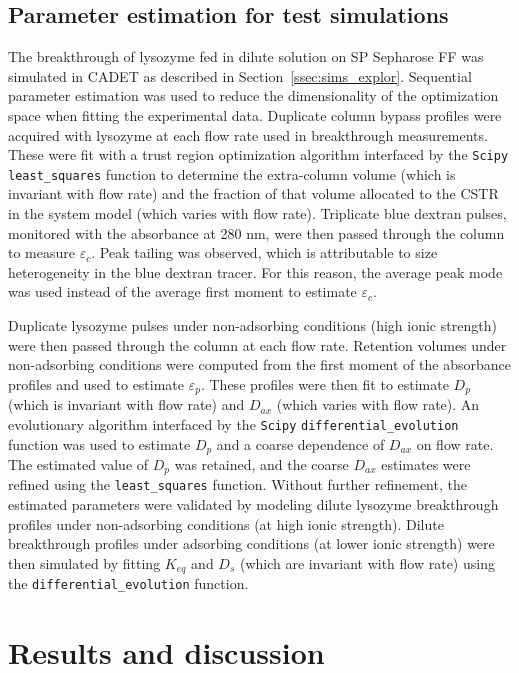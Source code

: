 \documentclass[preprint,review,12pt]{elsarticle}
\begin{document}
    \subsection{Parameter estimation for test simulations} \label{ssec:params}
        The breakthrough of lysozyme fed in dilute solution on SP Sepharose FF was simulated in CADET as described in Section~\ref{ssec:sims_explor}. Sequential parameter estimation was used to reduce the dimensionality of the optimization space when fitting the experimental data. Duplicate column bypass profiles were acquired with lysozyme at each flow rate used in breakthrough measurements. These were fit with a trust region optimization algorithm interfaced by the \texttt{Scipy} \texttt{least\_squares} function to determine the extra-column volume (which is invariant with flow rate) and the fraction of that volume allocated to the CSTR in the system model (which varies with flow rate). Triplicate blue dextran pulses, monitored with the absorbance at 280 nm, were then passed through the column to measure $\varepsilon_c$. Peak tailing was observed, which is attributable to size heterogeneity in the blue dextran tracer. For this reason, the average peak mode was used instead of the average first moment to estimate $\varepsilon_c$.

        Duplicate lysozyme pulses under non-adsorbing conditions (high ionic strength) were then passed through the column at each flow rate. Retention volumes under non-adsorbing conditions were computed from the first moment of the absorbance profiles and used to estimate $\varepsilon_p$. These profiles were then fit to estimate $D_p$ (which is invariant with flow rate) and $D_{ax}$ (which varies with flow rate). An evolutionary algorithm interfaced by the \texttt{Scipy} \texttt{differential\_evolution} function was used to estimate $D_p$ and a coarse dependence of $D_{ax}$ on flow rate. The estimated value of $D_p$ was retained, and the coarse $D_{ax}$ estimates were refined using the \texttt{least\_squares} function. Without further refinement, the estimated parameters were validated by modeling dilute lysozyme breakthrough profiles under non-adsorbing conditions (at high ionic strength). Dilute breakthrough profiles under adsorbing conditions (at lower ionic strength) were then simulated by fitting $K_{eq}$ and $D_s$ (which are invariant with flow rate) using the \texttt{differential\_evolution} function.


\section{Results and discussion} \label{sec:results}
\end{document}
